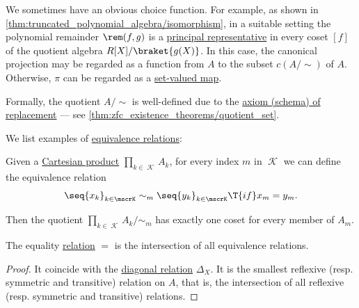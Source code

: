 \begin{comments}
\begin{definition}
\begin{thmenum}
    We sometimes have an obvious choice function. For example, as shown in \cref{thm:truncated_polynomial_algebra/isomorphism}, in a suitable setting the polynomial remainder \( \rem(f, g) \) is a \hyperref[def:quotient_polynomial_algebra_as_truncated]{principal representative} in every coset \( [f] \) of the quotient algebra \( R[X] / \braket{ g(X) } \). In this case, the canonical projection may be regarded as a function from \( A \) to the subset \( c(A / {\sim}) \) of \( A \). Otherwise, \( \pi \) can be regarded as a \hyperref[def:function]{set-valued map}.
  \end{thmenum}
\end{definition}
\begin{comments}
  \item Formally, the quotient \( A / {\sim} \) is well-defined due to the \hyperref[def:zfc/comprehension]{axiom (schema) of replacement} --- see \cref{thm:zfc_existence_theorems/quotient_set}.
\end{comments}

\begin{example}\label{ex:def:equivalence_relation}
  We list examples of \hyperref[def:equivalence_relation]{equivalence relations}:
  \begin{thmenum}
     Given a \hyperref[def:cartesian_product]{Cartesian product} \( \prod_{k \in \mscrK} A_k \), for every index \( m \) in \( \mscrK \) we can define the equivalence relation
    \begin{equation*}
       \seq{ x_k }_{k \in \mscrK} \sim_m \seq{ y_k }_{k \in \mscrK} \T{if} x_m = y_m.
    \end{equation*}

    Then the quotient \(\prod_{k \in \mscrK} A_k / {\sim_m} \) has exactly one coset for every member of \( A_m \).
  \end{thmenum}
\end{example}

\begin{proposition}\label{thm:equality_is_smallest_equivalence_relation}
  The equality \hyperref[def:binary_relation]{relation} \( = \) is the intersection of all equivalence relations.
\end{proposition}
\begin{proof}
  It coincide with the \hyperref[def:binary_relation/diagonal]{diagonal relation} \( \Delta_X \). It is the smallest reflexive (resp. symmetric and transitive) relation on \( A \), that is, the intersection of all reflexive (resp. symmetric and transitive) relations.
\end{proof}


\end{comments}
